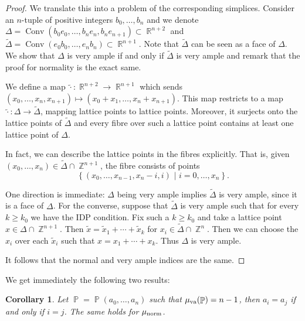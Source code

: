 \documentclass[a4paper,11pt]{amsart}
\theoremstyle{plain}
\newtheorem{corollary}[theorem]{Corollary}
\theoremstyle{definition}
\theoremstyle{remark}
\DeclareMathOperator{\ZZ}{\mathbb{Z}}
\DeclareMathOperator{\RR}{\mathbb{R}}
\DeclareMathOperator{\PP}{\mathbb{P}}
\DeclareMathOperator{\Conv}{Conv}
\DeclareMathOperator{\munorm}{\mu_{\text norm}}
\DeclareMathOperator{\muva}{\mu_{\text va}}
\begin{document}
\begin{proof}
    We translate this into a problem of the corresponding simplices.
    Consider an $n$-tuple of positive integers $b_0, \dots , b_n$ and we denote $\Delta = \Conv(b_0e_{0}, \dots , b_ne_n, b_ne_{n+1}) \subset \RR^{n+2}$ and $\widetilde{\Delta} = \Conv(e_0b_0, \dots , e_nb_n) \subset \RR^{n+1}$.
    Note that $\widetilde{\Delta}$ can be seen as a face of $\Delta$.
    We show that $\Delta$ is very ample if and only if $\widetilde{\Delta}$ is very ample and remark that the proof for normality is the exact same.
    
    We define a map $\widetilde{ \cdot} : \RR^{n+2} \rightarrow \RR^{n+1}$ which sends $(x_0, \dots , x_n,x_{n+1}) \mapsto (x_0 + x_1, \dots , x_n+x_{n+1})$.
    This map restricts to a map $\widetilde{\cdot} : \Delta \rightarrow \widetilde{\Delta}$, mapping lattice points to lattice points.
    Moreover, it surjects onto the lattice points of $\widetilde{\Delta}$ and every fibre over such a lattice point contains at least one lattice point of $\Delta$.
    
    In fact, we can describe the lattice points in the fibres explicitly.
    That is, given $(x_0, \dots , x_n) \in \widetilde{\Delta}\cap \ZZ^{n+1}$, the fibre consists of points
    \[\left\{(x_0, \dots ,x_{n-1},x_{n}-i,i)\,\, | \,\, i=0, \dots , x_n \right\}.\]

    One direction is immediate: $\Delta$ being very ample implies $\widetilde{\Delta}$ is very ample, since it is a face of $\Delta$.
    For the converse, suppose that $\widetilde{\Delta}$ is very ample such that for every $k \geq k_0$ we have the IDP condition.
    Fix such a $k \geq k_0$ and take a lattice point $x \in \Delta \cap \ZZ^{n+1}$.
    Then $\widetilde{x} = \widetilde{x}_1 + \cdots + \widetilde{x}_k$ for $x_i \in \widetilde{\Delta} \cap \ZZ^n$.
    Then we can choose the $x_i$ over each $\widetilde{x}_i$ such that
    $x = x_1 + \cdots + x_k$.
    Thus $\Delta$ is very ample.

    It follows that the normal and very ample indices are the same.
\end{proof}

We get immediately the following two results:
\begin{corollary}\label{corollary:max-muva-distinct-weights}
    Let $\PP = \PP(a_0, \dots , a_n)$ such that $\muva(\PP) = n-1$, then $a_i = a_j$ if and only if $i = j$.
    The same holds for $\munorm$.
\end{corollary}
\end{document}
